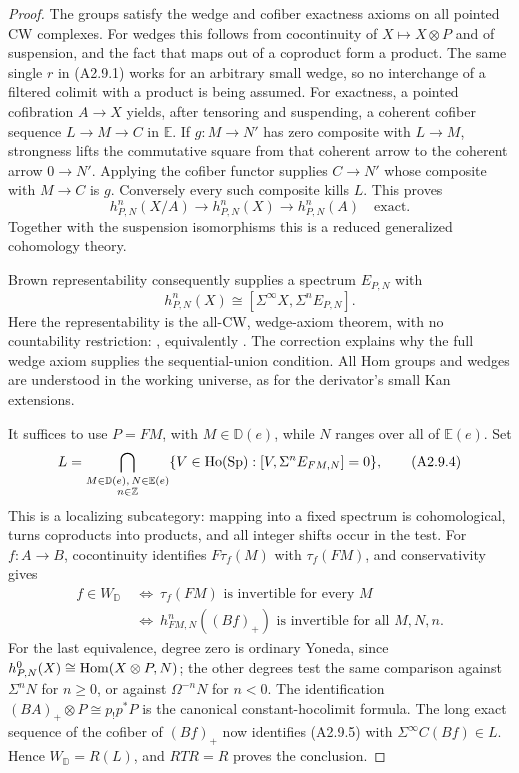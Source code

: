 \begin{proof}
The groups satisfy the wedge and cofiber exactness axioms on all pointed
CW complexes. For wedges this follows from cocontinuity of
$X\mapsto X\otimes P$ and of suspension, and the fact that maps out of a
coproduct form a product. The same single $r$ in (A2.9.1) works for an
arbitrary small wedge, so no interchange of a filtered colimit with a
product is being assumed.
For exactness, a pointed cofibration $A\to X$ yields, after tensoring and
suspending, a coherent cofiber sequence $L\to M\to C$ in $\mathbb E$.
If $g:M\to N'$ has zero composite with $L\to M$, strongness lifts the
commutative square from that coherent arrow to the coherent arrow
$0\to N'$. Applying the cofiber functor supplies $C\to N'$ whose
composite with $M\to C$ is $g$. Conversely every such composite kills
$L$. This proves
\[
 h^n_{P,N}(X/A)\longrightarrow h^n_{P,N}(X)
                    \longrightarrow h^n_{P,N}(A)
 \quad\text{exact}.
 \tag{A2.9.2}
\]
Together with the suspension isomorphisms this is a reduced generalized
cohomology theory.

Brown representability consequently supplies a spectrum $E_{P,N}$ with
\[
 h^n_{P,N}(X)\cong
 [\Sigma^\infty X,\Sigma^nE_{P,N}].
 \tag{A2.9.3}
\]
Here the representability is the all-CW, wedge-axiom theorem, with no
countability restriction: \cite[Theorem~II, condition~(4.6), and the
1963 correction]{A2Brown}, equivalently
\cite[Theorem~4E.1, pp.~448--452]{A2Hatcher}. The correction explains why
the full wedge axiom supplies the sequential-union condition. All Hom
groups and wedges are understood in the working universe, as for
the derivator's small Kan extensions.

It suffices to use $P=FM$, with $M\in\mathbb D(e)$, while $N$ ranges over
all of $\mathbb E(e)$. Set
\[
 L=\bigcap_{\substack{M\in\mathbb D(e),\,N\in\mathbb E(e)\\ n\in\mathbb Z}}
       \{V\in\mathrm{Ho}(\mathrm{Sp}):[V,\Sigma^nE_{FM,N}]=0\},
 \tag{A2.9.4}
\]
This is a localizing subcategory:
mapping into a fixed spectrum is cohomological, turns coproducts into
products, and all integer shifts occur in the test.
For $f:A\to B$, cocontinuity identifies
$F\tau_f(M)$ with $\tau_f(FM)$, and conservativity gives
\[
 \begin{aligned}
 f\in W_{\mathbb D}
 &\ \Longleftrightarrow\
 \tau_f(FM)\text{ is invertible for every }M\\
 &\ \Longleftrightarrow\
 h^n_{FM,N}((Bf)_+)\text{ is invertible for all }M,N,n.
 \end{aligned}
 \tag{A2.9.5}
\]
For the last equivalence, degree zero is ordinary Yoneda, since
$h^0_{P,N}(X)\cong\operatorname{Hom}(X\otimes P,N)$; the other degrees test the same
comparison against $\Sigma^nN$ for $n\geq0$, or against
$\Omega^{-n}N$ for $n<0$. The identification
$(BA)_+\otimes P\cong p_!p^*P$ is the canonical constant-hocolimit
formula. The long exact sequence of the cofiber of $(Bf)_+$ now identifies
(A2.9.5) with $\Sigma^\infty C(Bf)\in L$. Hence
$W_{\mathbb D}=R(L)$, and $RTR=R$ proves the conclusion.


\end{proof}
